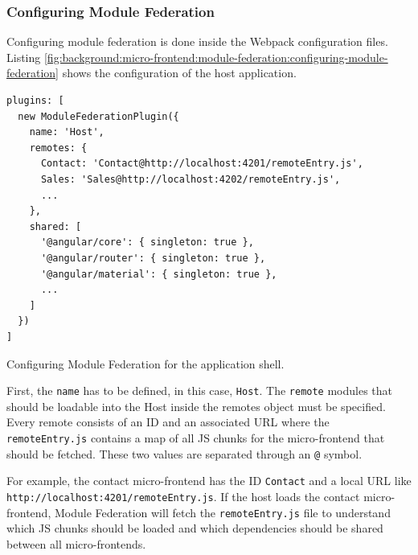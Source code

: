 \subsubsection{Configuring Module Federation}\label{subsubsection:background:micro-frontend:module-federation:configuring-module-federation}

Configuring module federation is done inside the Webpack configuration files. Listing \ref{fig:background:micro-frontend:module-federation:configuring-module-federation} shows the configuration of the host application.

\ifshowListings
\begin{listing}[H]
    \begin{verbatim}
plugins: [
  new ModuleFederationPlugin({
    name: 'Host',
    remotes: {
      Contact: 'Contact@http://localhost:4201/remoteEntry.js',
      Sales: 'Sales@http://localhost:4202/remoteEntry.js',
      ...
    },
    shared: [
      '@angular/core': { singleton: true },
      '@angular/router': { singleton: true },
      '@angular/material': { singleton: true },
      ...
    ]
  })
]
    \end{verbatim}
    \caption{Configuring Module Federation for the application shell.}\label{fig:background:micro-frontend:module-federation:configuring-module-federation}
\end{listing}
\fi

\noindent First, the \texttt{name} has to be defined, in this case, \texttt{Host}. The \texttt{remote} modules that should be loadable into the Host inside the remotes object must be specified. Every remote consists of an ID and an associated \ac{URL} where the \texttt{remoteEntry.js} contains a map of all \ac{JS} chunks for the micro-frontend that should be fetched. These two values are separated through an \texttt{@} symbol. \cite[124]{book:2021:mezzalira:applied-methods:building-micro-frontends}

\bigskip

\noindent For example, the contact micro-frontend has the ID \texttt{Contact} and a local \ac{URL} like \texttt{http:\slash \slash localhost:4201\slash remoteEntry.js}. If the host loads the contact micro-frontend, Module Federation will fetch the \texttt{remoteEntry.js} file to understand which \ac{JS} chunks should be loaded and which dependencies should be shared between all micro-frontends. \cite[125]{book:2021:mezzalira:applied-methods:building-micro-frontends}

\bigskip

